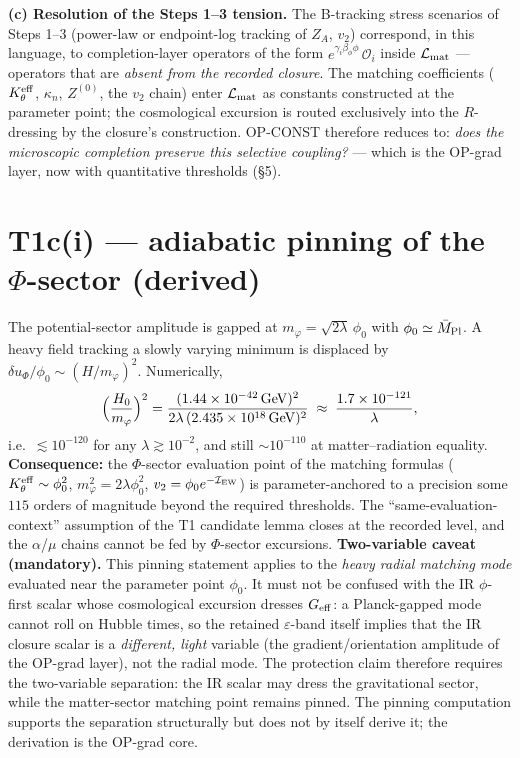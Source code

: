 \documentclass[11pt,a4paper]{article}
\begin{document}
\textbf{(c) Resolution of the Steps 1--3 tension.} The B-tracking stress
scenarios of Steps 1--3 (power-law or endpoint-log tracking of $Z_A$, $v_2$)
correspond, in this language, to completion-layer operators of the form
$e^{\gamma_i\beta_\phi\phi}\,\mathcal O_i$ inside $\mathcal L_{\rm mat}$ ---
operators that are \emph{absent from the recorded closure}. The matching
coefficients ($K_\theta^{\rm eff}$, $\kappa_n$, $Z^{(0)}$, the $v_2$ chain) enter
$\mathcal L_{\rm mat}$ as constants constructed at the parameter point; the
cosmological excursion is routed exclusively into the $R$-dressing by the
closure's construction. OP-CONST therefore reduces to: \emph{does the microscopic
completion preserve this selective coupling?} --- which is the OP-grad layer,
now with quantitative thresholds (\S5).

\section{T1c(i) --- adiabatic pinning of the $\Phi$-sector (derived)}
The potential-sector amplitude is gapped at $m_\varphi=\sqrt{2\lambda}\,\phi_0$
with $\phi_0\simeq\bar M_{\rm Pl}$. A heavy field tracking a slowly varying
minimum is displaced by $\delta u_\Phi/\phi_0\sim(H/m_\varphi)^2$. Numerically,
\[
\Big(\frac{H_0}{m_\varphi}\Big)^2=\frac{(1.44\times10^{-42}\,{\rm GeV})^2}
{2\lambda\,(2.435\times10^{18}\,{\rm GeV})^2}\;\approx\;\frac{1.7\times10^{-121}}
{\lambda},
\]
i.e.\ $\lesssim10^{-120}$ for any $\lambda\gtrsim10^{-2}$, and still
$\sim10^{-110}$ at matter--radiation equality. \textbf{Consequence:} the
$\Phi$-sector evaluation point of the matching formulas
($K_\theta^{\rm eff}\sim\phi_0^2$, $m_\varphi^2=2\lambda\phi_0^2$,
$v_2=\phi_0e^{-\mathcal I_{\rm EW}}$) is parameter-anchored to a precision some
$115$ orders of magnitude beyond the required thresholds. The
``same-evaluation-context'' assumption of the T1 candidate lemma closes at the
recorded level, and the $\alpha$/$\mu$ chains cannot be fed by $\Phi$-sector
excursions. \textbf{Two-variable caveat (mandatory).} This pinning statement
applies to the \emph{heavy radial matching mode} evaluated near the parameter
point $\phi_0$. It must not be confused with the IR $\phi$-first scalar whose
cosmological excursion dresses $G_{\rm eff}$: a Planck-gapped mode cannot roll
on Hubble times, so the retained $\varepsilon$-band itself implies that the IR
closure scalar is a \emph{different, light} variable (the gradient/orientation
amplitude of the OP-grad layer), not the radial mode. The protection claim
therefore requires the two-variable separation: the IR scalar may dress the
gravitational sector, while the matter-sector matching point remains pinned.
The pinning computation supports the separation structurally but does not by
itself derive it; the derivation is the OP-grad core.
\end{document}
